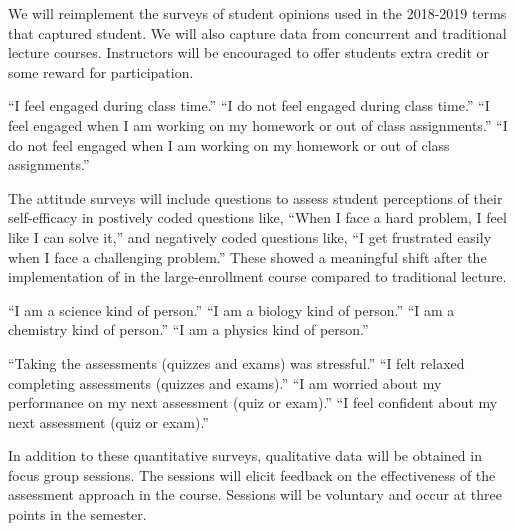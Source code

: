 \documentclass[10pt,letterpaper]{article}
\begin{document}
We will reimplement the surveys of student opinions used in the 2018-2019 terms that captured student.
We will also capture data from concurrent \pogil and traditional lecture courses. Instructors will be encouraged to offer students extra credit or some reward for participation.

``I feel engaged during class time.'' ``I do not feel engaged during class time.'' ``I feel engaged when I am working on my homework or out of class assignments.'' ``I do not feel engaged when I am working on my homework or out of class assignments.''


The attitude surveys will include questions to assess student perceptions of their self-efficacy in postively coded questions like, ``When I face a hard problem, I feel like I can solve it,'' and negatively coded questions like, ``I get frustrated easily when I face a challenging problem.'' These showed a meaningful shift after the implementation of \pogil  in the large-enrollment course compared to traditional lecture.

``I am a science kind of person.'' ``I am a biology kind of person.'' ``I am a chemistry kind of person.'' ``I am a physics kind of person.'' 

``Taking the assessments (quizzes and exams) was stressful.'' ``I felt relaxed completing assessments (quizzes and exams).'' ``I am worried about my performance on my next assessment (quiz or exam).'' ``I feel confident about my next assessment (quiz or exam).''

 In addition to these quantitative surveys, qualitative data will be obtained in focus group sessions. The sessions will elicit feedback on the effectiveness of the assessment approach in the course. Sessions will be voluntary and occur at three points in the semester.
\end{document}
